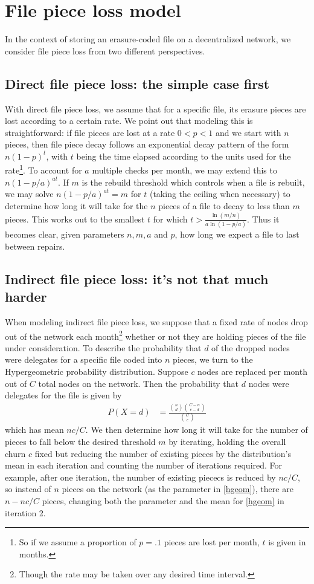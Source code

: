\section{File piece loss model}
\label{appendix:RS}
\linespread{2.0}

In the context of storing an erasure-coded file on a decentralized network, we consider file piece loss from two different perspectives.

\subsection{Direct file piece loss: the simple case first}
With direct file piece loss, we assume that for a specific file, its erasure pieces are lost according to a certain rate. We point out that modeling this is straightforward: if file pieces are lost at a rate $0<p<1$ and we start with $n$ pieces, then file piece decay follows an exponential decay pattern of the form $n(1-p)^t$, with $t$ being the time elapsed according to the units used for the rate\footnote{So if we assume a proportion of $p=.1$ pieces are lost per month, $t$ is given in months.}. 
To account for $a$ multiple checks per month, we may extend this to $n(1-p/a)^{at}$. If $m$ is the rebuild threshold which controls when a file is rebuilt, we may solve $n(1-p/a)^{at}=m$ for $t$ (taking the ceiling when necessary) to determine how long it will take for the $n$ pieces of a file to decay to less than $m$ pieces. This works out to the smallest $t$ for which
$t>\frac{\ln(m/n)}{a\ln(1-p/a)}$. Thus it becomes clear, given parameters $n,m,a$ and $p$, how long we expect a file to last between repairs.

\subsection{Indirect file piece loss: it's not that much harder}

When modeling indirect file piece loss, we suppose that a fixed rate of nodes 
drop out of the network each month\footnote{Though the rate may be taken over 
any desired time interval.} whether or not they are holding pieces of the file 
under consideration. To describe the probability that $d$ of the dropped nodes 
were delegates for a specific file coded into $n$ pieces, we turn to the 
Hypergeometric probability distribution. Suppose $c$ nodes are replaced per 
month out of $C$ total nodes on the network. Then the probability that $d$ 
nodes were delegates for the file is given by
\begin{align}
    P(X=d)&=\frac{\binom{n}{d}\binom{C-n}{c-d}}{\binom{C}{c}}\label{hgeom}
\end{align}
which has mean $nc/C$. We then determine how long it will take for the number of pieces to fall below the desired threshold $m$ by iterating, holding the overall churn $c$ fixed but reducing the number of existing pieces by the distribution's mean in each iteration and counting the number of iterations required. For example, after one iteration, the number of existing piececs is reduced by $nc/C$, so instead of $n$ pieces on the network (as the parameter in \eqref{hgeom}), there are $n-nc/C$ pieces, changing both the parameter and the mean for \eqref{hgeom} in iteration 2.

